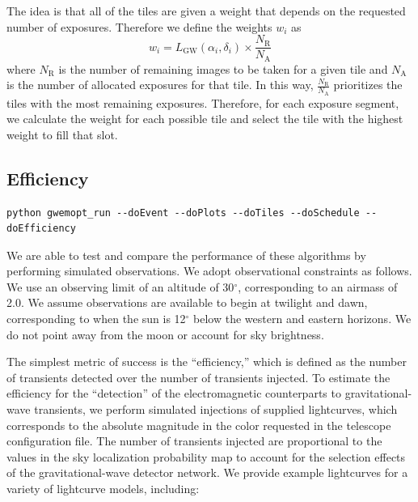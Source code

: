 \documentclass[twocolumn]{aastex62}
\begin{document}
The idea is that all of the tiles are given a weight that depends on the requested number of exposures. 
Therefore we define the weights $w_i$ as
\begin{equation}
w_i = L_\textrm{GW}(\alpha_i,\delta_i) \times \frac{N_\textrm{R}}{N_\textrm{A}} 
\end{equation}
where $N_\textrm{R}$ is the number of remaining images to be taken for a given tile and $N_\textrm{A}$ is the number of allocated exposures for that tile.
In this way, $\frac{N_\textrm{R}}{N_\textrm{A}}$ prioritizes the tiles with the most remaining exposures.
Therefore, for each exposure segment, we calculate the weight for each possible tile and select the tile with the highest weight to fill that slot.
\subsection{Efficiency}
\label{subsection:efficiency}
\begin{lstlisting}
python gwemopt_run --doEvent --doPlots --doTiles --doSchedule --doEfficiency
\end{lstlisting}
We are able to test and compare the performance of these algorithms by performing simulated observations. 
We adopt observational constraints as follows. 
We use an observing limit of an altitude of 30$^\circ$, corresponding to an airmass of 2.0. 
We assume observations are available to begin at twilight and dawn, corresponding to when the sun is 12$^\circ$ below the western and eastern horizons.
We do not point away from the moon or account for sky brightness.

The simplest metric of success is the ``efficiency,'' which is defined as the number of transients detected over the number of transients injected.
To estimate the efficiency for the ``detection'' of the electromagnetic counterparts to gravitational-wave transients, we perform simulated injections of supplied lightcurves, which corresponds to the absolute magnitude in the color requested in the telescope configuration file. 
The number of transients injected are proportional to the values in the sky localization probability map to account for the selection effects of the gravitational-wave detector network.
We provide example lightcurves for a variety of lightcurve models, including:
\end{document}
